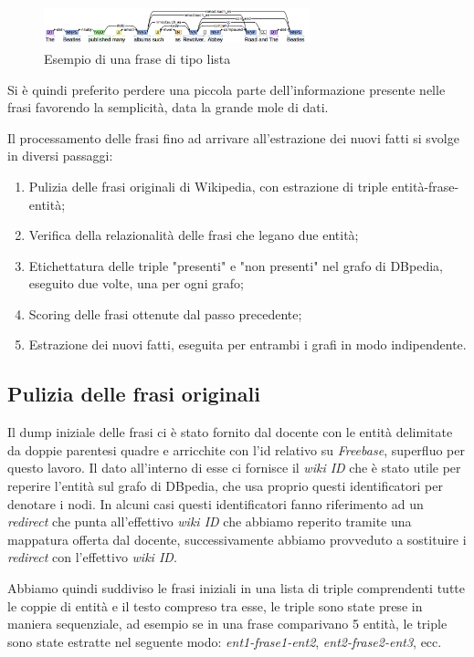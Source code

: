 \documentclass[10pt,a4paper,twocolumn]{article}
\begin{document}
\begin{figure}[h]
	\includegraphics[width=7.7cm, height=1.2cm]{stanford}
	\caption{Esempio di una frase di tipo lista}
\end{figure}

Si è quindi preferito perdere una piccola parte dell'informazione presente nelle frasi favorendo la semplicità, data la grande mole di dati.

Il processamento delle frasi fino ad arrivare all'estrazione dei nuovi fatti si svolge in diversi passaggi:
\begin{enumerate}
\item Pulizia delle frasi originali di Wikipedia, con estrazione di triple entità-frase-entità;
\item Verifica della relazionalità delle frasi che legano due entità;
\item Etichettatura delle triple "presenti" e "non presenti" nel grafo di DBpedia, eseguito due volte, una per ogni grafo;
\item Scoring delle frasi ottenute dal passo precedente;
\item Estrazione dei nuovi fatti, eseguita per entrambi i grafi in modo indipendente.
\end{enumerate}

\subsection{Pulizia delle frasi originali}

Il dump iniziale delle frasi ci è stato fornito dal docente con le entità delimitate da doppie parentesi quadre e arricchite con l'id relativo su \textit{Freebase}, superfluo per questo lavoro. Il dato all'interno di esse ci fornisce il \textit{wiki ID} che è stato utile per reperire l'entità sul grafo di DBpedia, che usa proprio questi identificatori per denotare i nodi. In alcuni casi questi identificatori fanno riferimento ad un \textit{redirect} che punta all'effettivo \textit{wiki ID} che abbiamo reperito tramite una mappatura offerta dal docente, successivamente abbiamo provveduto a sostituire i \textit{redirect} con l'effettivo \textit{wiki ID}.

Abbiamo quindi suddiviso le frasi iniziali in una lista di triple comprendenti tutte le coppie di entità e il testo compreso tra esse, le triple sono state prese in maniera sequenziale, ad esempio se in una frase comparivano 5 entità, le triple sono state estratte nel seguente modo: \textit{ent1-frase1-ent2}, \textit{ent2-frase2-ent3}, ecc.
\end{document}
